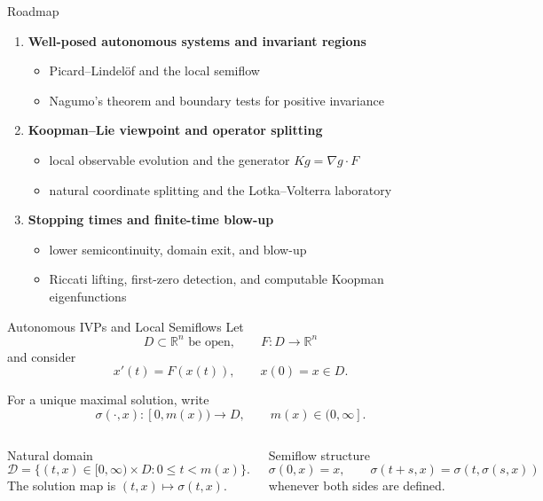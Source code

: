 \documentclass[aspectratio=169,11pt]{beamer}
\newcommand{\R}{\mathbb{R}}
\newcommand{\mstop}{m}
\newcommand{\flow}{\sigma}
\begin{document}
\begin{frame}{Roadmap}
\begin{enumerate}
  \item \textbf{Well-posed autonomous systems and invariant regions}
  \begin{itemize}
    \item Picard--Lindel\"of and the local semiflow
    \item Nagumo's theorem and boundary tests for positive invariance
  \end{itemize}
  \item \textbf{Koopman--Lie viewpoint and operator splitting}
  \begin{itemize}
    \item local observable evolution and the generator \(Kg=\nabla g\cdot F\)
    \item natural coordinate splitting and the Lotka--Volterra laboratory
  \end{itemize}
  \item \textbf{Stopping times and finite-time blow-up}
  \begin{itemize}
    \item lower semicontinuity, domain exit, and blow-up
    \item Riccati lifting, first-zero detection, and computable Koopman eigenfunctions
  \end{itemize}
\end{enumerate}
\end{frame}

\begin{frame}{Autonomous IVPs and Local Semiflows}
\small
Let
\[
\boxed{D\subset\R^n\text{ be open}},\qquad \boxed{F:D\to\R^n}
\]
and consider
\[
x'(t)=F(x(t)),\qquad x(0)=x\in D.
\]

For a unique maximal solution, write
\[
\flow(\cdot,x):[0,\mstop(x))\to D,
\qquad \mstop(x)\in(0,\infty].
\]

\begin{columns}[T,onlytextwidth]
\begin{block}{Natural domain}
\[
\mathcal D
=
\{(t,x)\in[0,\infty)\times D:
0\le t<\mstop(x)\}.
\]
The solution map is \((t,x)\mapsto\flow(t,x)\).
\end{block}

\begin{alertblock}{Semiflow structure}
\[
\flow(0,x)=x,
\qquad
\flow(t+s,x)=\flow(t,\flow(s,x))
\]
whenever both sides are defined.
\end{alertblock}
\end{columns}
\end{frame}
\end{document}
